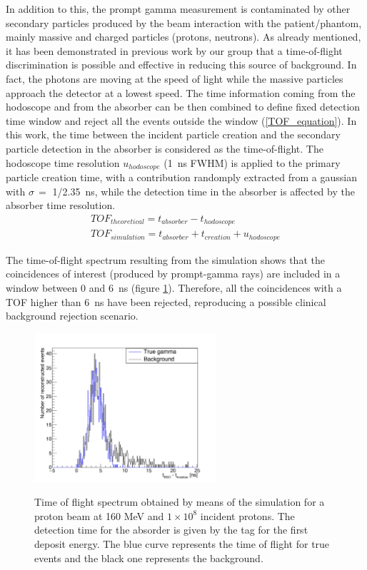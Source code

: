 In addition to this, the prompt gamma measurement is contaminated by other secondary particles produced by the beam interaction with the patient/phantom, mainly massive and charged particles (protons, neutrons). 
As already mentioned, it has been demonstrated in previous work by our group that a time-of-flight discrimination is possible and effective in reducing this source of background. In fact, the photons are moving at the speed of light while the massive particles approach the detector at a lowest speed. The time information coming from the hodoscope and from the absorber can be then combined to define fixed detection time window and reject all the events outside the window (\ref{TOF_equation}). In this work, the time between the incident particle creation and the secondary particle detection in the absorber is considered as the time-of-flight. The hodoscope time resolution $u_{hodoscope}$ (1~ns FWHM) is applied to the primary particle creation time, with a contribution randomply extracted from a gaussian with $\sigma\,=$ 1/2.35~ns, while the detection time in the absorber is affected by the absorber time resolution.\\
 \begin{eqnarray}
TOF_{theoretical} = t_{absorber}-t_{hodoscope} \\
TOF_{simulation} = t_{absorber}+t_{creation} + u_{hodoscope}
\label{TOF_equation}
\end{eqnarray} 

The time-of-flight spectrum resulting from the simulation shows that the coincidences of interest (produced by prompt-gamma rays) are included in a window between 0 and 6~ns (figure \ref{fig:fig_TOF_distribution_CC_simulation_Hadronth}). Therefore, all the coincidences with a TOF higher than 6~ns have been rejected, reproducing a possible clinical background rejection scenario. 

	\begin{figure} [!hbtp]	
	\centering
	\caption{Time of flight spectrum obtained by means of the simulation for a proton beam at 160 MeV and $1\times10^{8}$ incident protons. The detection time for the absorder is given by the tag for the first deposit energy. The blue curve represents the time of flight for true events and the black one represents the background.}	
	\includegraphics[width=0.6\textwidth]{./Figure/2015_01_04_TOF_spectra_NoCut_1Proton_ResolTemporelle_applied_these.jpg}
	\label{fig:fig_TOF_distribution_CC_simulation_Hadronth}
	\end{figure}

